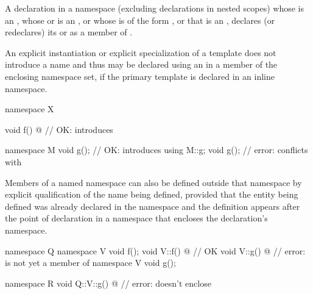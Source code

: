 \pnum
A declaration in a namespace  (excluding declarations in nested scopes)
whose  is an ,
whose  or
 is an , or
whose  is of the form 
 , or
that is an ,
declares (or redeclares) its  or
 as a member of .
\begin{note}
An explicit instantiation or
explicit specialization of a template
does not introduce a name and thus may be declared using an
 in a member of the enclosing namespace set,
if the primary template is declared in an inline namespace.
\end{note}
\begin{example}
\begin{codeblock}
namespace X {
  void f() { @\commentellip@ }        // OK: introduces 

  namespace M {
    void g();                   // OK: introduces 
  }
  using M::g;
  void g();                     // error: conflicts with 
}
\end{codeblock}
\end{example}

\pnum
Members of a named namespace can also be
defined outside that namespace by explicit
qualification of the name being defined, provided
that the entity being defined was already declared in the namespace and
the definition appears after the point of declaration in a namespace
that encloses the declaration's namespace.
\begin{example}
\begin{codeblock}
namespace Q {
  namespace V {
    void f();
  }
  void V::f() { @\commentellip@ }     // OK
  void V::g() { @\commentellip@ }     // error:  is not yet a member of 
  namespace V {
    void g();
  }
}

namespace R {
  void Q::V::g() { @\commentellip@ }  // error:  doesn't enclose 
}
\end{codeblock}
\end{example}

